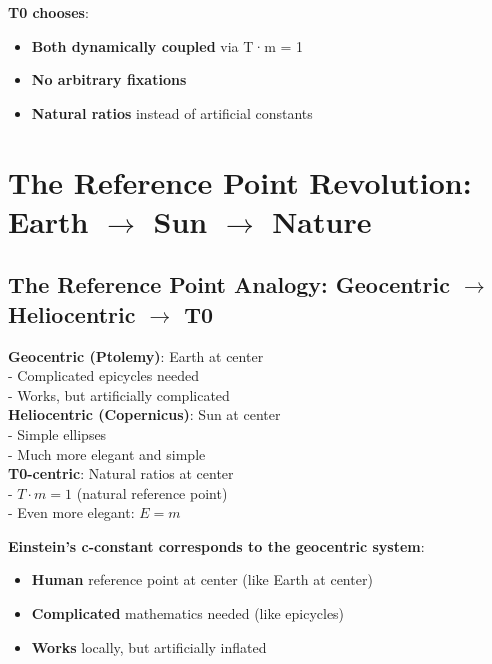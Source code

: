 \documentclass[12pt,a4paper]{article}
\newcommand{\Tfield}{T}
\begin{document}
	\textbf{T0 chooses}:
	\begin{itemize}
		\item \textbf{Both dynamically coupled} via T·m = 1
		\item \textbf{No arbitrary fixations}
		\item \textbf{Natural ratios} instead of artificial constants
	\end{itemize}
	
	\section{The Reference Point Revolution: Earth $\rightarrow$ Sun $\rightarrow$ Nature}
	
	\subsection{The Reference Point Analogy: Geocentric $\rightarrow$ Heliocentric $\rightarrow$ T0}
	
	\begin{tcolorbox}[colback=blue!5!white,colframe=blue!75!black,title=The Reference Point Revolution: From Earth $\rightarrow$ Sun $\rightarrow$ Nature]
		\textbf{Geocentric (Ptolemy)}: Earth at center \\
		- Complicated epicycles needed \\
		- Works, but artificially complicated \\
		
		\textbf{Heliocentric (Copernicus)}: Sun at center \\
		- Simple ellipses \\
		- Much more elegant and simple \\
		
		\textbf{T0-centric}: Natural ratios at center \\
		- $\Tfield \cdot m = 1$ (natural reference point) \\
		- Even more elegant: $E = m$
	\end{tcolorbox}
	
	\textbf{Einstein's c-constant corresponds to the geocentric system}:
	\begin{itemize}
		\item \textbf{Human} reference point at center (like Earth at center)
		\item \textbf{Complicated} mathematics needed (like epicycles)
		\item \textbf{Works} locally, but artificially inflated
	\end{itemize}
	
\end{document}
